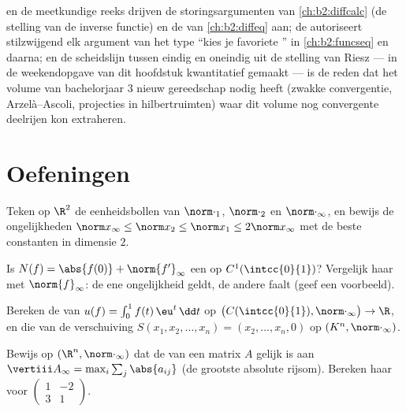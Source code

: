 \begin{remark}
 en de meetkundige reeks drijven de
storingsargumenten van \cref{ch:b2:diffcalc} (de stelling van de
inverse functie) en de  van \cref{ch:b2:diffeq}
aan; de  autoriseert stilzwijgend elk
argument van het type ``kies je favoriete '' in
\cref{ch:b2:funcseq} en daarna; en de scheidslijn tussen eindig en
oneindig uit de stelling van Riesz --- in de weekendopgave van dit
hoofdstuk kwantitatief gemaakt --- is de reden dat het volume van
bachelorjaar 3 nieuw gereedschap nodig heeft (zwakke convergentie,
Arzelà--Ascoli, projecties in hilbertruimten) waar dit volume nog
convergente deelrijen kon extraheren.
\end{remark}

\section{Oefeningen}

\begin{exercise}[$\star$]\label{exo:b2:nvs:1}
Teken op $\R^2$ de eenheidsbollen van $\norm\cdot_1$,
$\norm\cdot_2$ en $\norm\cdot_\infty$, en bewijs de ongelijkheden
$\norm x_\infty \leq \norm x_2 \leq \norm x_1 \leq 2\norm
x_\infty$ met de beste constanten in dimensie $2$.
\end{exercise}

\begin{exercise}[$\star$]\label{exo:b2:nvs:2}
Is $N(f) = \abs{f(0)} + \norm{f'}_\infty$ een  op
$C^1(\intcc{0}{1})$? Vergelijk haar met $\norm{f}_\infty$: de ene
ongelijkheid geldt, de andere faalt (geef een voorbeeld).
\end{exercise}

\begin{exercise}[$\star$]\label{exo:b2:nvs:3}
Bereken de  van $u(f) = \int_0^1 f(t)\,\eu^t\,\dd t$ op
$\bigl(C(\intcc{0}{1}), \norm\cdot_\infty\bigr) \to \R$, en die van
de verschuiving $S(x_1, x_2, \dots, x_n) = (x_2, \dots, x_n, 0)$ op
$(K^n, \norm\cdot_\infty)$.
\end{exercise}

\begin{exercise}[$\star\star$]\label{exo:b2:nvs:4}
Bewijs op $(\R^n, \norm\cdot_\infty)$ dat de  van een
matrix $A$ gelijk is aan $\vertiii A_\infty = \max_i \sum_j
\abs{a_{ij}}$ (de grootste absolute rijsom). Bereken haar voor
$\begin{pmatrix} 1 & -2\\ 3 & 1\end{pmatrix}$.
\end{exercise}

